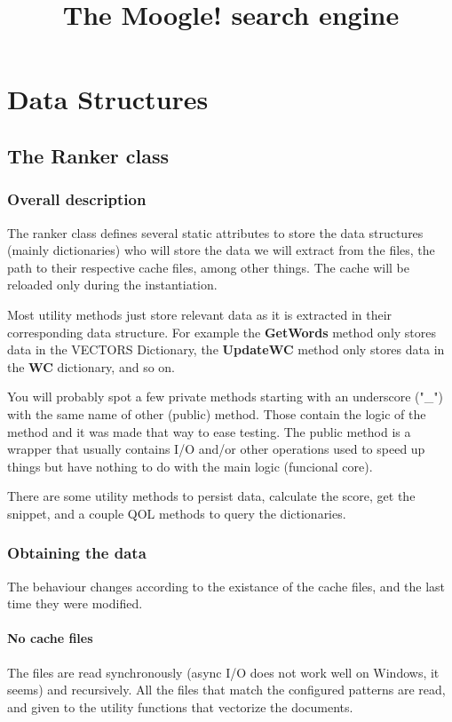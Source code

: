 \documentclass{report}
\title{The Moogle! search engine}
\begin{document}
\maketitle

\tableofcontents

\chapter{Data Structures}
\section{The Ranker class}


\subsection{Overall description}

The ranker class defines several static attributes to store the data structures (mainly dictionaries) who will store the data we will extract from the files, the path to their respective cache files, among other things.
The cache will be reloaded only during the instantiation.

Most utility methods just store relevant data as it is extracted in their corresponding data structure. For example the \textbf{GetWords} method only stores data in the VECTORS Dictionary, the \textbf{UpdateWC} method only stores data in the \textbf{WC} dictionary, and so on.

You will probably spot a few private methods starting with an underscore ("\_") with the same name of other (public) method. Those contain the logic of the method and it was made that way to ease testing. The public method is a wrapper that usually contains I/O and/or other operations used to speed up things but have nothing to do with the main logic (funcional core).

There are some utility methods to persist data, calculate the score, get the snippet, and a couple QOL methods to query the dictionaries.

\subsection{Obtaining the data}

The behaviour changes according to the existance of the cache files, and the last time they were modified.

\subsubsection{No cache files}
The files are read synchronously (async I/O does not work well on Windows, it seems) and recursively. All the files that match the configured patterns are read, and given to the utility functions that vectorize the documents.
\end{document}
